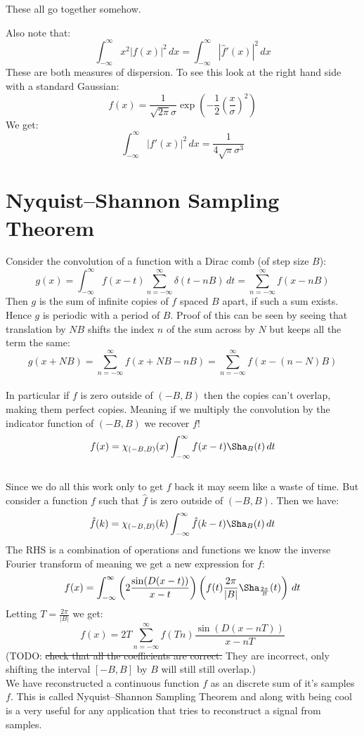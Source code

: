 These all go together somehow.

Also note that:
\[\int_{-\infty}^{\infty}x^2|f(x)|^2\,dx = \int_{-\infty}^{\infty}|\hat{f}'(x)|^2\,dx\]
These are both measures of dispersion.
To see this look at the right hand side with a standard Gaussian:
\[f(x) = \frac{1}{\sqrt{2\pi}\sigma}\exp\left(-\frac{1}{2}\left(\frac{x}{\sigma}\right)^2 \right)\]
We get:
\[\int_{-\infty}^{\infty}|f'(x)|^2\,dx = \frac{1}{4\sqrt{\pi}\sigma^3} \]

\section{Nyquist–Shannon Sampling Theorem}
Consider the convolution of a function with a Dirac comb (of step size $B$):
\[g(x) = \int_{-\infty}^{\infty}f(x-t)\sum_{n=-\infty}^{\infty}\delta(t-nB)\,dt = \sum_{n=-\infty}^{\infty}f(x-nB)\]
Then $g$ is the sum of infinite copies of $f$ spaced $B$ apart, if such a sum exists.
Hence $g$ is periodic with a period of $B$. 
Proof of this can be seen by seeing that translation by $NB$ shifts the index $n$ of the sum across by $N$ but keeps all the term the same:
\[g(x+NB) = \sum_{n=-\infty}^{\infty}f(x+NB-nB) = \sum_{n=-\infty}^{\infty}f(x-(n-N)B) \]
\\

In particular if $f$ is zero outside of $(-B,B)$ then the copies can't overlap, making them perfect copies.
Meaning if we multiply the convolution by the indicator function of $(-B,B)$ we recover $f$!
\[f(x) = \chi_{(-B,B)}(x)\int_{-\infty}^{\infty}f(x-t)\Sha_B(t)\,dt\]
\\

Since we do all this work only to get $f$ back it may seem like a waste of time.
But consider a function $f$ such that $\hat{f}$ is zero outside of $(-B,B)$.
Then we have:
\[\hat{f}(k) = \chi_{(-B,B)}(k)\int_{-\infty}^{\infty}\hat{f}(k-t)\Sha_B(t)\,dt\]
The RHS is a combination of operations and functions we know the inverse Fourier transform of meaning we get a new expression for $f$:
\[f(x) = \int_{-\infty}^{\infty}\left(2\frac{\sin(D(x-t))}{x-t}\right)\left(f(t)\frac{2\pi}{|B|}\Sha_{\frac{2\pi}{B}}(t)\right)\,dt \]
Letting $T = \frac{2\pi}{|B|}$ we get:
\[ f(x) = 2T\sum_{n=-\infty}^{\infty}f(Tn)\frac{\sin(D(x-nT))}{x-nT} \]
(TODO: \st{check that all the coefficients are correct.} They are incorrect,
only shifting the interval $[-B,B]$ by $B$ will still still overlap.)
\\

We have reconstructed a continuous function $f$ as an discrete sum of it's samples $f$.
This is called Nyquist–Shannon Sampling Theorem and along with being cool is a very useful for any application that tries to reconstruct a signal from samples.

